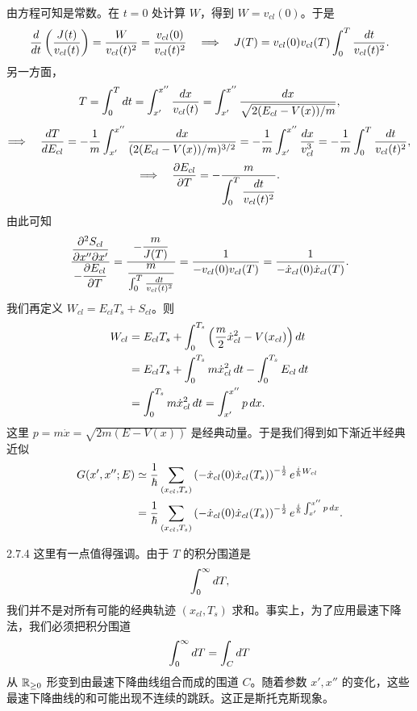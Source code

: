 由方程可知是常数。在 $t=0$ 处计算 $W$，得到 $W=v_{cl}(0)$。于是
\[
\frac{d}{d t}\left(\frac{J(t)}{v_{cl}(t)}\right)
=\frac{W}{v_{cl}(t)^2}=\frac{v_{cl}(0)}{v_{cl}(t)^2}
\quad\Longrightarrow\quad
J(T)=v_{cl}(0)v_{cl}(T)\int_0^T\frac{d t}{v_{cl}(t)^2}.
\]
另一方面，
\[
T=\int_0^Td t=\int_{x'}^{x''}\frac{d x}{v_{cl}(t)}
=\int_{x'}^{x''}\frac{d x}{\sqrt{2(E_{cl}-V(x))/m}},
\]
\[
\Longrightarrow\quad
\frac{d T}{d E_{cl}}
=-\frac1m\int_{x'}^{x''}
\frac{d x}{(2(E_{cl}-V(x))/m)^{3/2}}
=-\frac1m\int_{x'}^{x''}\frac{d x}{v_{cl}^3}
=-\frac1m\int_0^T\frac{d t}{v_{cl}(t)^2},
\]
\[
\Longrightarrow\quad
\frac{\partial E_{cl}}{\partial T}
=-\frac{m}{\displaystyle\int_0^T\frac{d t}{v_{cl}(t)^2}}.
\]
由此可知
\[
\frac{\dfrac{\partial^2 S_{cl}}{\partial x''\partial x'}}{-\dfrac{\partial E_{cl}}{\partial T}}
=\frac{-\dfrac{m}{J(T)}}{
\dfrac{m}{\int_0^T\frac{d t}{v_{cl}(t)^2}}}
=\frac1{-v_{cl}(0)v_{cl}(T)}
=\frac1{-\dot x_{cl}(0)\dot x_{cl}(T)}.
\]
我们再定义 $W_{cl}=E_{cl}T_s+S_{cl}$。则
\[
\begin{aligned}
W_{cl}
&=E_{cl}T_s+\int_0^{T_s}\left(\frac{m}{2}\dot x_{cl}^2-V(x_{cl})\right)d t\\
&=E_{cl}T_s+\int_0^{T_s}m\dot x_{cl}^2\,d t-\int_0^{T_s}E_{cl}\,d t\\
&=\int_0^{T_s}m\dot x_{cl}^2\,d t=\int_{x'}^{x''}p\,d x.
\end{aligned}
\]
这里 $p=m\dot x=\sqrt{2m(E-V(x))}$ 是经典动量。于是我们得到如下渐近半经典近似
\[
\begin{aligned}
G(x',x'';E)
&\simeq\frac1{\hbar}\sum_{(x_{cl},T_s)}
\left(-\dot x_{cl}(0)\dot x_{cl}(T_s)\right)^{-\frac12}
e^{\frac{i}{\hbar}W_{cl}}\\
&=\frac1{\hbar}\sum_{(x_{cl},T_s)}
\left(-\dot x_{cl}(0)\dot x_{cl}(T_s)\right)^{-\frac12}
e^{\frac{i}{\hbar}\int_{x'}^{x''}p\,d x}.
\end{aligned}
\]

\begin{remark}{2.7.4}
  这里有一点值得强调。由于 $T$ 的积分围道是
  \[
  \int_0^{\infty}d T,
  \]
  我们并不是对所有可能的经典轨迹 $(x_{cl},T_s)$ 求和。事实上，为了应用最速下降法，我们必须把积分围道
  \[
  \int_0^{\infty}d T=\int_Cd T
  \]
  从 $\mathbb{R}_{\ge0}$ 形变到由最速下降曲线组合而成的围道 $C$。随着参数 $x',x''$ 的变化，这些最速下降曲线的和可能出现不连续的跳跃。这正是斯托克斯现象。
\end{remark}

